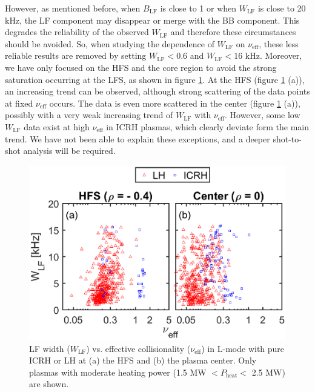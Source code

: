 However, as mentioned before, when $B_\mathrm{LF}$ is close to 1 or when $W_\mathrm{LF}$ is close to 20 kHz, the LF component may disappear or merge with the BB component. This degrades the reliability of the observed $W_\mathrm{LF}$ and therefore these circumstances should be avoided. So, when studying the dependence of $W_\mathrm{LF}$ on $\nu_\mathrm{eff}$, these less reliable results are removed by setting $W_\mathrm{LF} < 0.6$ and $W_\mathrm{LF} < 16 $ kHz. Moreover, we have only focused on the HFS and the core region to avoid the strong saturation occurring at the LFS, as shown in figure \ref{fig:WLF_nu_Lmode}. At the HFS (figure \ref{fig:WLF_nu_Lmode} (a)), an increasing trend can be observed, although strong scattering of the data points at fixed $\nu_\mathrm{eff}$ occurs. The data is even more scattered in the center (figure \ref{fig:WLF_nu_Lmode} (a)), possibly with a very weak increasing trend of $W_\mathrm{LF}$ with $\nu_\mathrm{eff}$. However, some low $W_\mathrm{LF}$ data exist at high $\nu_\mathrm{eff}$ in ICRH plasmas, which clearly deviate form the main trend. We have not been able to explain these exceptions, and a deeper shot-to-shot analysis will be required.


\begin{figure}[h]
\begin{centering}
\includegraphics[scale=0.83]{fig_WLF_nu_r0_HFS_Lmode.eps}
\par\end{centering}
\caption{LF width ($W_\mathrm{LF}$) vs. effective collisionality ($\nu_\mathrm{eff}$) in L-mode with pure ICRH or LH at (a) the HFS and (b) the plasma center. Only plasmas with moderate heating power (1.5 MW $< P_\mathrm{heat} <$ 2.5 MW) are shown.}
\label{fig:WLF_nu_Lmode}
\end{figure}


